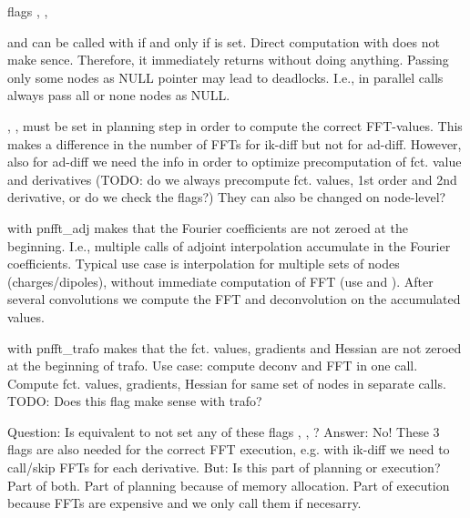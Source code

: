 \begin{compactitem}
  \item flags , , 
  \item {} and  can be called with  if and only if  is set. 
    Direct computation with  does not make sence. Therefore, it immediately returns without doing anything.
    Passing only some nodes as NULL pointer may lead to deadlocks. I.e., in parallel calls always pass all or none nodes as NULL.
  \item {}, ,  must be set in planning step in order to compute the correct FFT-values.
        This makes a difference in the number of FFTs for ik-diff but not for ad-diff. However, also for ad-diff we need the info in order to optimize precomputation
        of fct. value and derivatives (TODO: do we always precompute fct. values, 1st order and 2nd derivative, or do we check the flags?)
        They can also be changed on node-level?
  \item {} with pnfft_adj makes that the Fourier coefficients are not zeroed at the beginning.
    I.e., multiple calls of adjoint interpolation accumulate in the Fourier coefficients. Typical use case is interpolation for multiple sets of nodes (charges/dipoles),
    without immediate computation of FFT (use  and ). After several convolutions we compute the FFT and deconvolution
    on the accumulated values.
  \item {} with pnfft_trafo makes that the fct. values, gradients and Hessian are not zeroed at the beginning of trafo.
    Use case: compute deconv and FFT in one call. Compute fct. values, gradients, Hessian for same set of nodes in separate calls. TODO: Does this flag make sense with trafo?
  \item Question: Is  equivalent to not set any of these flags , , ?
    Answer: No! These 3 flags are also needed for the correct FFT execution, e.g. with ik-diff we need to call/skip FFTs for each derivative.
    But: Is this part of planning or execution? Part of both. 
      Part of planning because of memory allocation. 
      Part of execution because FFTs are expensive and we only call them if necesarry.
\end{compactitem}


